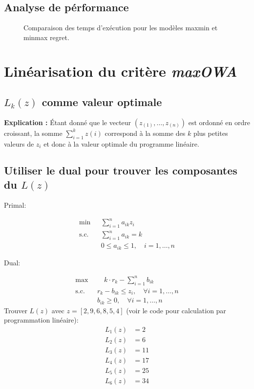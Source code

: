 \documentclass[10pt,a4paper]{report}
\begin{document}
\section{Analyse de pérformance}
\begin{figure}[h!]
    \centering
      
    \caption{Comparaison des temps d'exécution pour les modèles maxmin et minmax regret.}
    \label{fig:performance_ex1}
\end{figure}
\chapter{Linéarisation du critère \textit{maxOWA}}
\section{$L_k(z)$ comme valeur optimale}
\textbf{Explication :} Étant donné que le vecteur $(z_{(1)}, \ldots, z_{(n)})$ est ordonné en ordre croissant, la somme $\sum_{i=1}^{k} z(i)$ correspond à la somme des $k$ plus petites valeurs de $z_i$ et donc à la valeur optimale du programme linéaire.
\section{Utiliser le dual pour trouver les composantes du $L(z)$ }
Primal:

\begin{align*}
\min & \sum_{i=1}^{n} a_{ik} z_i \\
\text{s.c.} \quad & \sum_{i=1}^{n} a_{ik} = k \\
& 0 \leq a_{ik} \leq 1, \quad i = 1, \dots, n
\end{align*}

Dual:

\begin{align*}
\max & \quad k \cdot r_k - \sum_{i=1}^{n} b_{ik} \\
\text{s.c.} \quad & r_k - b_{ik} \leq z_i, \quad \forall i = 1, \dots, n \\
& b_{ik} \geq 0, \quad \forall i = 1, \dots, n
\end{align*}
Trouver $L(z)$ avec $z=[2,9,6,8,5,4]$ (voir le code pour calculation par programmation linéaire):
\begin{align*}
L_1(z)&= 2\\
L_2(z)&= 6\\
L_3(z)&= 11\\
L_4(z)&= 17\\
L_5(z)&= 25\\
L_6(z)&= 34\\
\end{align*}
\end{document}
